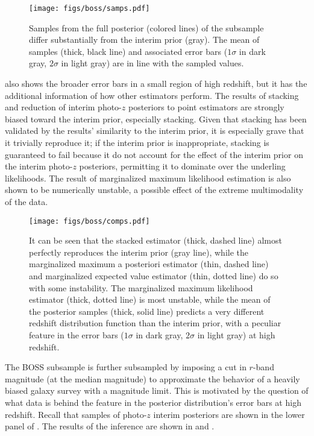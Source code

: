 \begin{figure}
	\texttt{[image: figs/boss/samps.pdf]}
	\caption{Samples from the full posterior (colored lines) of the subsample differ substantially from the interim prior (gray).  
		The mean of samples (thick, black line) and associated error bars ($1\sigma$ in dark gray, $2\sigma$ in light gray) are in line with the sampled values.}
\end{figure}

 also shows the broader error bars in a small region of high redshift, but it has the additional information of how other estimators perform.  
The results of stacking and reduction of interim photo-$z$ posteriors to point estimators are strongly biased toward the interim prior, especially stacking.  
Given that stacking has been validated by the results' similarity to the interim prior, it is especially grave that it trivially reproduce it; if the interim prior is inappropriate, stacking is guaranteed to fail because it do not account for the effect of the interim prior on the interim photo-$z$ posteriors, permitting it to dominate over the underling likelihoods.  
The result of marginalized maximum likelihood estimation is also shown to be numerically unstable, a possible effect of the extreme multimodality of the data.  

\begin{figure}
	\texttt{[image: figs/boss/comps.pdf]}
	\caption{It can be seen that the stacked estimator (thick, dashed line) almost perfectly reproduces the interim prior (gray line), while the marginalized maximum a posteriori estimator (thin, dashed line) and marginalized expected value estimator (thin, dotted line) do so with some instability.  
		The marginalized maximum likelihood estimator (thick, dotted line) is most unstable, while the mean of the posterior samples (thick, solid line) predicts a very different redshift distribution function than the interim prior, with a peculiar feature in the error bars ($1\sigma$ in dark gray, $2\sigma$ in light gray) at high redshift.}
\end{figure}

The BOSS subsample is further subsampled by imposing a cut in $r$-band magnitude (at the median magnitude) to approximate the behavior of a heavily biased galaxy survey with a magnitude limit.  
This is motivated by the question of what data is behind the feature in the posterior distribution's error bars at high redshift.  
Recall that samples of photo-$z$ interim posteriors are shown in the lower panel of .  
The results of the inference are shown in  and .  

